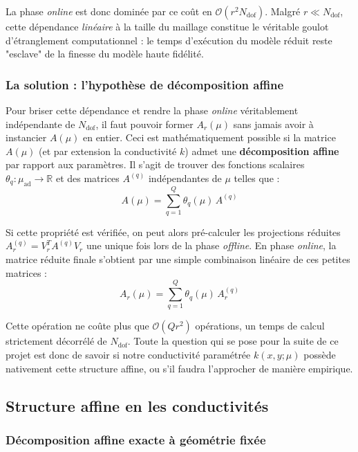 \documentclass[12pt,a4paper]{article}
\begin{document}
La phase \textit{online} est donc dominée par ce coût en $\mathcal{O}(r^2 N_{\text{dof}})$. Malgré $r \ll N_{\text{dof}}$, cette dépendance \textit{linéaire} à la taille du maillage constitue le véritable goulot d'étranglement computationnel : le temps d'exécution du modèle réduit reste "esclave" de la finesse du modèle haute fidélité.

\subsubsection{La solution : l'hypothèse de décomposition affine}

Pour briser cette dépendance et rendre la phase \textit{online} véritablement indépendante de $N_{\text{dof}}$, il faut pouvoir former $A_r(\mu)$ sans jamais avoir à instancier $A(\mu)$ en entier. Ceci est mathématiquement possible si la matrice $A(\mu)$ (et par extension la conductivité $k$) admet une \textbf{décomposition affine} par rapport aux paramètres. Il s'agit de trouver des fonctions scalaires $\theta_q : \mu_{\text{ad}} \to \mathbb{R}$ et des matrices $A^{(q)}$ indépendantes de $\mu$ telles que :
\begin{equation*}
    A(\mu) = \sum_{q=1}^{Q} \theta_q(\mu)\, A^{(q)}
\end{equation*}

Si cette propriété est vérifiée, on peut alors pré-calculer les projections réduites $A_r^{(q)} = V_r^T A^{(q)} V_r$ une unique fois lors de la phase \textit{offline}. En phase \textit{online}, la matrice réduite finale s'obtient par une simple combinaison linéaire de ces petites matrices :
\begin{equation*}
    A_r(\mu) = \sum_{q=1}^{Q} \theta_q(\mu)\, A_r^{(q)}
\end{equation*}

Cette opération ne coûte plus que $\mathcal{O}(Q r^2)$ opérations, un temps de calcul strictement décorrélé de $N_{\text{dof}}$. Toute la question qui se pose pour la suite de ce projet est donc de savoir si notre conductivité paramétrée $k(x, y; \mu)$ possède nativement cette structure affine, ou s'il faudra l'approcher de manière empirique.
 
\subsection{Structure affine en les conductivités}
 
\subsubsection{Décomposition affine exacte à géométrie fixée}
 
\end{document}

